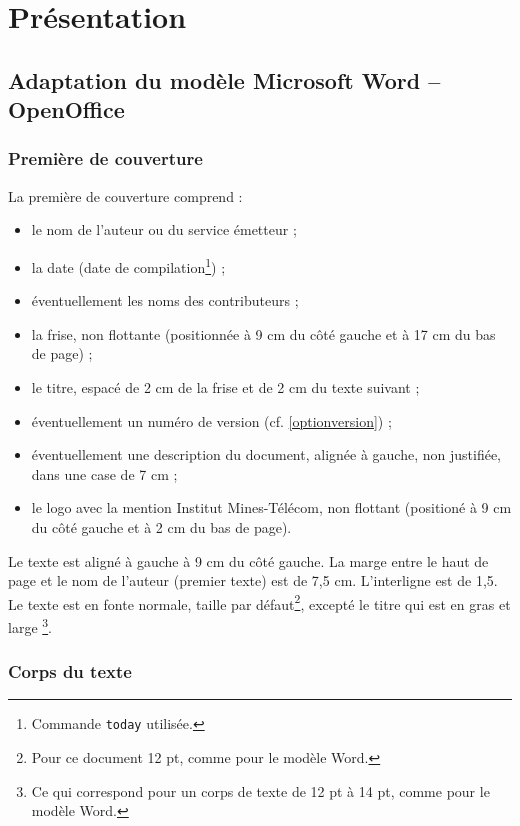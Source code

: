 \section{Présentation}
\subsection{Adaptation du modèle Microsoft Word -- OpenOffice}
\subsubsection{Première de couverture}
La première de couverture comprend :
\begin{itemize}
	\item le nom de l'auteur ou du service émetteur ;
	\item la date (date de compilation\footnote{Commande \texttt{today} utilisée.}) ;
	\item éventuellement les noms des contributeurs ;
	\item la frise, non flottante (positionnée à 9 cm du côté gauche et à 17 cm du bas de page) ;
	\item le titre, espacé de 2 cm de la frise et de 2 cm du texte suivant ;
	\item éventuellement un numéro de version (cf. \ref{optionversion}) ;
	\item éventuellement une description du document, alignée à gauche, non justifiée, dans une case de 7 cm ;
	\item le logo avec la mention Institut Mines-Télécom, non flottant (positioné à 9 cm du côté gauche et à 2 cm du bas de page).
\end{itemize}\bigskip

Le texte est aligné à gauche à 9 cm du côté gauche. La marge entre le haut de page et le nom de l'auteur (premier texte) est de 7,5 cm.  L'interligne est de 1,5. Le texte est en fonte normale, taille par défaut\footnote{Pour ce document 12 pt, comme pour le modèle Word.}, excepté le titre qui est en gras et \og large \fg\footnote{Ce qui correspond pour un corps de texte de 12 pt à 14 pt, comme pour le modèle Word.}.

\subsubsection{Corps du texte}

